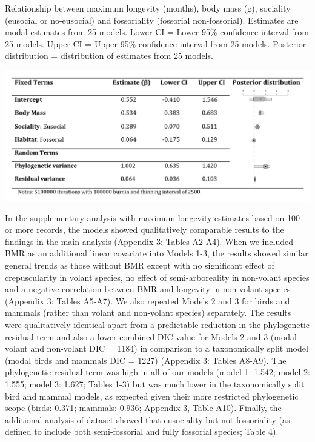 \begin{table}[h!]
  \caption[Table 4.]{Relationship between maximum longevity (months), body mass (g), sociality (eusocial or no-eusocial) and fossoriality (fossorial non-fossorial). Estimates are modal estimates from 25 models. Lower CI = Lower 95\% confidence interval from 25 models. Upper CI = Upper 95\% confidence interval from 25 models. Posterior distribution = distribution of estimates from 25 models.}
  \label{tbl:Table 4.}
  \includegraphics[width=\linewidth]{ch3-longevity/Table4.pdf}
\end{table}



In the supplementary analysis with maximum longevity estimates based on 100 or more records, the models showed qualitatively comparable results to the findings in the main analysis (Appendix 3: Tables A2-A4). When we included BMR as an additional linear covariate into Models 1-3, the results showed similar general trends as those without BMR except with no significant effect of crepuscularity in volant species, no effect of semi-arboreality in non-volant species and a negative correlation between BMR and longevity in non-volant species (Appendix 3: Tables A5-A7).  We also repeated Models 2 and 3 for birds and mammals (rather than volant and non-volant species) separately. The results were qualitatively identical apart from a predictable reduction in the phylogenetic residual term and also a lower combined DIC value for Models 2 and 3 (modal volant and non-volant DIC = 1184) in comparison to a taxonomically split model (modal birds and mammals DIC  = 1227) (Appendix 3: Tables A8-A9). The phylogenetic residual term was high in all of our models (model 1: 1.542; model 2: 1.555; model 3: 1.627; Tables 1-3) but was much lower in the taxonomically split bird and mammal models, as expected given their more restricted phylogenetic scope (birds: 0.371; mammals: 0.936; Appendix 3, Table A10). Finally, the additional analysis of \cite{williams2015ecology} dataset showed that eusociality but not fossoriality (as defined to include both semi-fossorial and fully fossorial species; Table 4).



